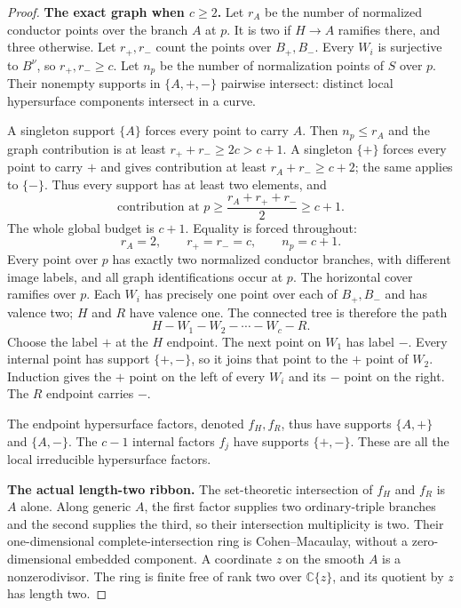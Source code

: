 \begin{proof}
\par\medskip\noindent\textbf{The exact graph when $c\ge2$.}
Let $r_A$ be the number of normalized conductor
points over the branch $A$ at $p$. It is two if
$H\to A$ ramifies there, and three otherwise.
Let $r_+,r_-$ count the points over $B_+,B_-$.
Every $W_i$ is surjective to $B^\nu$, so
$r_+,r_-\ge c$. Let $n_p$ be the number of
normalization points of $S$ over $p$.
Their nonempty supports in $\{A,+,-\}$ pairwise
intersect: distinct local hypersurface components
intersect in a curve.

A singleton support $\{A\}$ forces every point to
carry $A$. Then $n_p\le r_A$ and the graph
contribution is at least $r_++r_-\ge2c>c+1$.
A singleton $\{+\}$ forces every point to carry
$+$ and gives contribution at least
$r_A+r_-\ge c+2$; the same applies to $\{-\}$.
Thus every support has at least two elements, and
\[
 \text{contribution at }p
       \ge\frac{r_A+r_++r_-}{2}\ge c+1.
\]
The whole global budget is $c+1$. Equality is
forced throughout:
\[
                 r_A=2,\qquad r_+=r_-=c,\qquad n_p=c+1.
                                                               \tag{R20.2}
\]
Every point over $p$ has exactly two normalized
conductor branches, with different image labels,
and all graph identifications occur at $p$.
The horizontal cover ramifies over $p$.
Each $W_i$ has precisely one point over each of
$B_+,B_-$ and has valence two; $H$ and $R$ have
valence one. The connected tree is therefore
the path
\[
                    H-W_1-W_2-\cdots-W_c-R.             \tag{R20.3}
\]
Choose the label $+$ at the $H$ endpoint. The next
point on $W_1$ has label $-$. Every internal point
has support $\{+,-\}$, so it joins that point to
the $+$ point of $W_2$. Induction gives the $+$
point on the left of every $W_i$ and its $-$
point on the right. The $R$ endpoint carries $-$.

The endpoint hypersurface factors, denoted
$f_H,f_R$, thus have supports $\{A,+\}$ and
$\{A,-\}$. The $c-1$ internal factors $f_j$
have supports $\{+,-\}$. These are all the local
irreducible hypersurface factors.

\par\medskip\noindent\textbf{The actual length-two ribbon.}
The set-theoretic intersection of $f_H$ and $f_R$
is $A$ alone. Along generic $A$, the first factor
supplies two ordinary-triple branches and the
second supplies the third, so their intersection
multiplicity is two. Their one-dimensional
complete-intersection ring is Cohen--Macaulay,
without a zero-dimensional embedded component.
A coordinate $z$ on the smooth $A$ is a
nonzerodivisor. The ring is finite free of rank
two over $\mathbb C\{z\}$, and its quotient by
$z$ has length two.


\end{proof}
